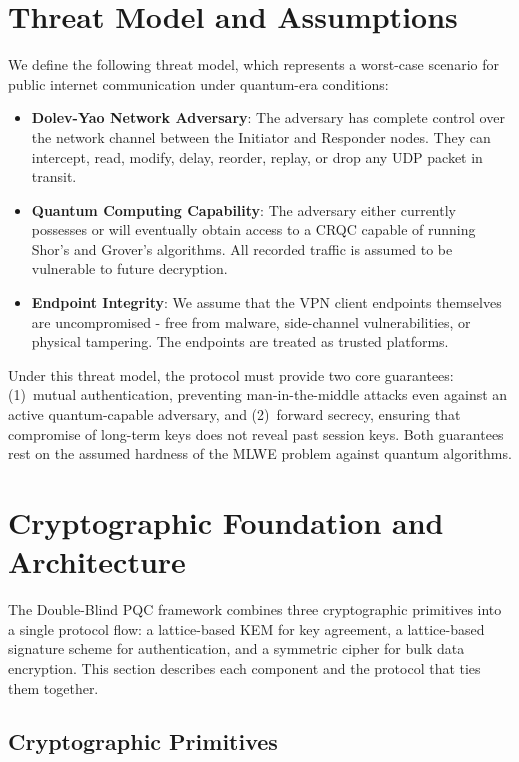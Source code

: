 \documentclass[10pt, conference, letterpaper]{IEEEtran}
\begin{document}
\section{Threat Model and Assumptions}
We define the following threat model, which represents a worst-case scenario for public internet communication under quantum-era conditions:

\begin{itemize}
    \item \textbf{Dolev-Yao Network Adversary}: The adversary has complete control over the network channel between the Initiator and Responder nodes. They can intercept, read, modify, delay, reorder, replay, or drop any UDP packet in transit.
    \item \textbf{Quantum Computing Capability}: The adversary either currently possesses or will eventually obtain access to a CRQC capable of running Shor's and Grover's algorithms. All recorded traffic is assumed to be vulnerable to future decryption.
    \item \textbf{Endpoint Integrity}: We assume that the VPN client endpoints themselves are uncompromised - free from malware, side-channel vulnerabilities, or physical tampering. The endpoints are treated as trusted platforms.
\end{itemize}

Under this threat model, the protocol must provide two core guarantees: (1)~mutual authentication, preventing man-in-the-middle attacks even against an active quantum-capable adversary, and (2)~forward secrecy, ensuring that compromise of long-term keys does not reveal past session keys. Both guarantees rest on the assumed hardness of the MLWE problem against quantum algorithms.

\section{Cryptographic Foundation and Architecture}

The Double-Blind PQC framework combines three cryptographic primitives into a single protocol flow: a lattice-based KEM for key agreement, a lattice-based signature scheme for authentication, and a symmetric cipher for bulk data encryption. This section describes each component and the protocol that ties them together.

\subsection{Cryptographic Primitives}
\end{document}
